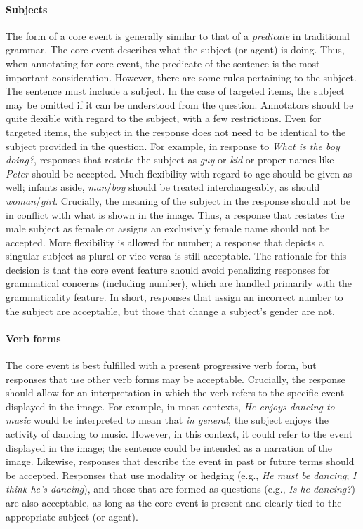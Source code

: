 \documentclass[12pt,notitlepage]{article}
\begin{document}
\paragraph{Subjects} \label{para:core-event-subjects} The form of a core event is generally similar to that of a \textit{predicate} in traditional grammar. The core event describes what the subject (or agent) is doing. Thus, when annotating for core event, the predicate of the sentence is the most important consideration. However, there are some rules pertaining to the subject. The sentence must include a subject. In the case of targeted items, the subject may be omitted if it can be understood from the question. Annotators should be quite flexible with regard to the subject, with a few restrictions. Even for targeted items, the subject in the response does not need to be identical to the subject provided in the question. For example, in response to \textit{What is the boy doing?}, responses that restate the subject as \textit{guy} or \textit{kid} or proper names like \textit{Peter} should be accepted. Much flexibility with regard to age should be given as well; infants aside, \textit{man}/\textit{boy} should be treated interchangeably, as should \textit{woman}/\textit{girl}. Crucially, the meaning of the subject in the response should not be in conflict with what is shown in the image. Thus, a response that restates the male subject as female or assigns an exclusively female name should not be accepted. More flexibility is allowed for number; a response that depicts a singular subject as plural or vice versa is still acceptable. The rationale for this decision is that the core event feature should avoid penalizing responses for grammatical concerns (including number), which are handled primarily with the grammaticality feature. In short, responses that assign an incorrect number to the subject  are acceptable, but those that change a subject's gender are not.

\paragraph{Verb forms}
The core event is best fulfilled with a present progressive verb form, but responses that use other verb forms may be acceptable. Crucially, the response should allow for an interpretation in which the verb refers to the specific event displayed in the image. For example, in most contexts, \textit{He enjoys dancing to music} would be interpreted to mean that \textit{in general}, the subject enjoys the activity of dancing to music. However, in this context, it could refer to the event displayed in the image; the sentence could be intended as a narration of the image. Likewise, responses that describe the event in past or future terms should be accepted. Responses that use modality or hedging (e.g., \textit{He must be dancing}; \textit{I think he's dancing}), and those that are formed as questions (e.g., \textit{Is he dancing?}) are also acceptable, as long as the core event is present and clearly tied to the appropriate subject (or agent).
\end{document}
